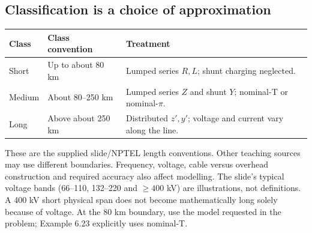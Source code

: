 \documentclass[11pt,a4paper]{article}
\begin{document}
\subsection{Classification is a choice of approximation}
\begin{center}\small
\begin{tabularx}{\textwidth}{L{2.7cm}L{2.9cm}Y}
\toprule\textbf{Class} & \textbf{Class convention} & \textbf{Treatment}\\\midrule
Short & Up to about 80 km & Lumped series $R,L$; shunt charging neglected.\\
Medium & About 80--250 km & Lumped series $Z$ and shunt $Y$; nominal-T or nominal-$\pi$.\\
Long & Above about 250 km & Distributed $z',y'$; voltage and current vary along the line.\\\bottomrule
\end{tabularx}\end{center}
These are the supplied slide/NPTEL length conventions. Other teaching sources may use different boundaries. Frequency, voltage, cable versus overhead construction and required accuracy also affect modelling. The slide's typical voltage bands (66--110, 132--220 and $\ge400$ kV) are illustrations, not definitions. A 400 kV short physical span does not become mathematically long solely because of voltage. At the 80 km boundary, use the model requested in the problem; Example 6.23 explicitly uses nominal-T.
\end{document}
